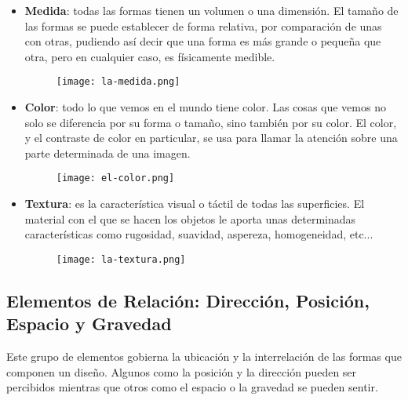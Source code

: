 \begin{itemize}
    \item \textbf{Medida}: todas las formas tienen un volumen o una dimensión. El tamaño de las formas se puede establecer de forma relativa, por comparación de unas con otras, pudiendo así decir que una forma es más grande o pequeña que otra, pero en cualquier caso, es físicamente medible.

    \begin{figure}[H]
        \centering
        \texttt{[image: la-medida.png]}
    \end{figure}

    \item \textbf{Color}: todo lo que vemos en el mundo tiene color. Las cosas que vemos no solo se diferencia por su forma o tamaño, sino también por su color. El color, y el contraste de color en particular, se usa para llamar la atención sobre una parte determinada de una imagen.

    \begin{figure}[H]
        \centering
        \texttt{[image: el-color.png]}
    \end{figure}

    \item \textbf{Textura}: es la característica visual o táctil de todas las superficies. El material con el que se hacen los objetos le aporta unas determinadas características como rugosidad, suavidad, aspereza, homogeneidad, etc...

    \begin{figure}[H]
        \centering
        \texttt{[image: la-textura.png]}
    \end{figure}
\end{itemize}

\subsection{Elementos de Relación: Dirección, Posición, Espacio y Gravedad}
Este grupo de elementos gobierna la ubicación y la interrelación de las formas que componen un diseño. Algunos como la posición y la dirección pueden ser percibidos mientras que otros como el espacio o la gravedad se pueden sentir.

